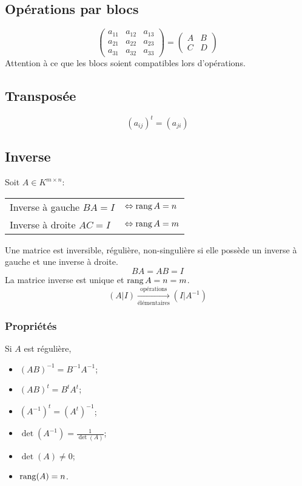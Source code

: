 \subsection{Opérations par blocs}
\[
  \left(
  \begin{array}{cc|c}
    a_{11} & a_{12} & a_{13} \\
    \hline
    a_{21} & a_{22} & a_{23} \\
    a_{31} & a_{32} & a_{33}
  \end{array}
  \right)
  = \begin{pmatrix}
    A&B \\
    C&D
  \end{pmatrix}
\]
Attention à ce que les blocs soient compatibles lors d'opérations.

\subsection{Transposée}
\[ (a_{ij})^t = (a_{ji}) \]

\subsection{Inverse}
Soit $A\in K^{m \times n}$:
\begin{center}
  \begin{tabular}{ll}
    Inverse à gauche $BA = I$ & $\Leftrightarrow \operatorname{rang} A  = n$\\
    Inverse à droite $AC = I$ & $\Leftrightarrow \operatorname{rang} A  = m$
  \end{tabular}
\end{center}

Une matrice est inversible, régulière, non-singulière
si elle possède un inverse à gauche et une inverse à droite.
\[ BA = AB = I \]
La matrice inverse est unique et $\operatorname{rang} A = n = m$.
\[ (A|I) \xrightarrow[\textrm{élémentaires}]{\textrm{opérations}} (I|A^{-1}) \]

\subsubsection{Propriétés}
Si $A$ est régulière,
\begin{itemize}
  \item $(AB)^{-1} = B^{-1}A^{-1}$;
  \item $(AB)^t = B^tA^t$;
  \item $(A^{-1})^t = (A^t)^{-1}$;
  \item $\det(A^{-1}) = \frac{1}{\det(A)}$;
  \item $\det(A) \neq 0$;
  \item $\operatorname{rang}(A) = n$.
\end{itemize}

